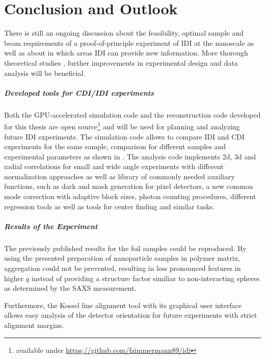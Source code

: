 \chapter{Conclusion and Outlook}
There is still an ongoing discussion about the feasibility, optimal sample and beam requirements of a proof-of-principle experiment of IDI at the nanoscale as well as about in which areas IDI can provide new information. More thorough theoretical studies , further improvements in experimental design and data analysis will be beneficial.


\paragraph{Developed tools for CDI/IDI experiments}
Both the GPU-accelerated simulation code and the reconstruction code developed for this thesis are open source\footnote{available under \url{https;//github.com/fzimmermann89/idi}} and will be used for planning and analyzing future IDI experiments. The simulation code allows to compare IDI and CDI experiments for the same sample, comparison for different samples and experimental parameters as shown in .
The analysis code implements 2d, 3d and radial correlations for small and wide angle experiments with different normalization approaches as well as library of commonly needed auxiliary functions, such as dark and mask generation for pixel detectors, a new common mode correction with adaptive block sizes, photon counting procedures, different regression tools as well as tools for center finding and similar tasks.








\paragraph{Results of the Experiment}

The previously published results for the foil samples could be reproduced.
By using the presented preparation of nanoparticle samples in polymer matrix, aggregation could not be prevented, resulting in less pronounced features in higher $q$ instead of providing a structure factor similiar to non-interacting spheres as determined by the SAXS measurement. 



Furthermore, the Kossel line alignment tool with its graphical user interface allows easy analysis of the detector orientation for future experiments with strict alignment margins.




